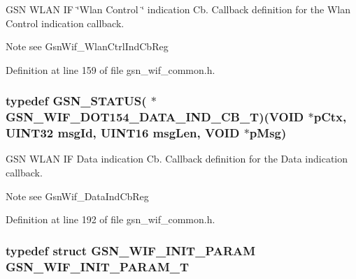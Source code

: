 GSN WLAN IF \char`\"{}Wlan Control \char`\"{} indication Cb. Callback definition for the Wlan Control indication callback. 

\begin{DoxyNote}{Note}
see GsnWif\_\-WlanCtrlIndCbReg 
\end{DoxyNote}


Definition at line 159 of file gsn\_\-wif\_\-common.h.

\hypertarget{a00635_gaeb1ca28d0827d970df3911f1bd46cf98}{
\subsubsection[{GSN\_\-WIF\_\-DOT154\_\-DATA\_\-IND\_\-CB\_\-T}]{\setlength{\rightskip}{0pt plus 5cm}typedef {\bf GSN\_\-STATUS}( $\ast$ {\bf GSN\_\-WIF\_\-DOT154\_\-DATA\_\-IND\_\-CB\_\-T})(VOID $\ast$pCtx, {\bf UINT32} msgId, {\bf UINT16} msgLen, VOID $\ast$pMsg)}}
\label{a00635_gaeb1ca28d0827d970df3911f1bd46cf98}


GSN WLAN IF Data indication Cb. Callback definition for the Data indication callback. 

\begin{DoxyNote}{Note}
see GsnWif\_\-DataIndCbReg 
\end{DoxyNote}


Definition at line 192 of file gsn\_\-wif\_\-common.h.

\hypertarget{a00635_gaf24820ac43e65f03340551f2b579f6f5}{
\subsubsection[{GSN\_\-WIF\_\-INIT\_\-PARAM\_\-T}]{\setlength{\rightskip}{0pt plus 5cm}typedef struct {\bf GSN\_\-WIF\_\-INIT\_\-PARAM} {\bf GSN\_\-WIF\_\-INIT\_\-PARAM\_\-T}}}
\label{a00635_gaf24820ac43e65f03340551f2b579f6f5}


